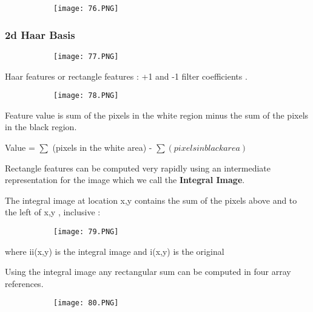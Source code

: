 \documentclass{article}
\begin{document}
\begin{figure}[ht!]
  \centering
  \begin{subfigure}[b]{0.6\linewidth}
    \texttt{[image: 76.PNG]}
  \end{subfigure}
\end{figure}


\subsubsection{2d Haar Basis}

\begin{figure}[ht!]
  \centering
  \begin{subfigure}[b]{0.6\linewidth}
    \texttt{[image: 77.PNG]}
  \end{subfigure}
\end{figure}

Haar features or rectangle features : +1 and -1 filter coefficients .

\begin{figure}[ht!]
  \centering
  \begin{subfigure}[b]{0.6\linewidth}
    \texttt{[image: 78.PNG]}
  \end{subfigure}
\end{figure}

Feature value is sum of the pixels in the white region minus the sum of the pixels in the black region.

Value = $\sum$ (pixels in the white area) - $\sum (pixels in black area)$

Rectangle features can be computed very rapidly using an intermediate representation for the image which we call the \textbf{Integral Image}. 

The integral image at location x,y contains the sum of the pixels above and to the left of x,y ,  inclusive :

\begin{figure}[ht!]
  \centering
  \begin{subfigure}[b]{0.3\linewidth}
    \texttt{[image: 79.PNG]}
  \end{subfigure}
\end{figure}

where ii(x,y) is the integral image and i(x,y) is the original 

Using the integral image any rectangular sum can be computed in four array references.

\begin{figure}[ht!]
  \centering
  \begin{subfigure}[b]{0.6\linewidth}
    \texttt{[image: 80.PNG]}
  \end{subfigure}
\end{figure}
\end{document}
